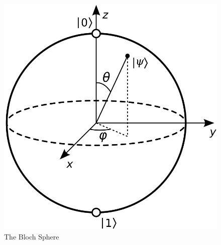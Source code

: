 \begin{figure}
\centering
\includegraphics[scale=0.2]{Bloch_sphere}
\caption{The Bloch Sphere}
\label{fig:Bloch}
\end{figure}

